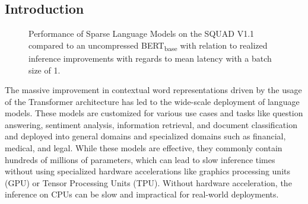 \subsection{Introduction}
\begin{figure}[!htb]
    \centering
    \caption{Performance of Sparse Language Models on the SQUAD V1.1 \cite{Rajpurkar2016SQuAD10} compared to an uncompressed BERT\textsubscript{base} \cite{Devlin2019BERTPO} with relation to realized inference improvements with regards to mean latency with a batch size of 1.}
    \label{fig:squadv1}
\end{figure}
The massive improvement in contextual word representations driven by the usage of the Transformer architecture \cite{Vaswani2017AttentionIA} has led to the wide-scale deployment of language models. These models are customized for various use cases and tasks like question answering, sentiment analysis, information retrieval, and document classification and deployed into general domains and specialized domains such as financial, medical, and legal. While these models are effective, they commonly contain hundreds of millions of parameters, which can lead to slow inference times without using specialized hardware accelerations like graphics processing units (GPU) or Tensor Processing Units (TPU). Without hardware acceleration, the inference on CPUs can be slow and impractical for real-world deployments.\\
